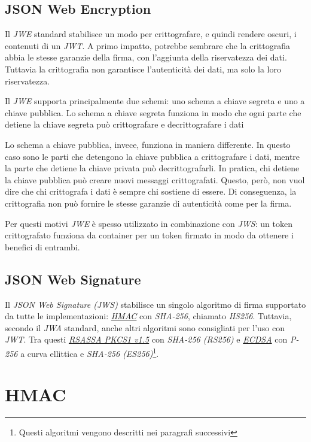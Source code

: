 \subsection{JSON Web Encryption}
Il \emph{\gls{JWE}} standard stabilisce un modo per crittografare, e quindi rendere oscuri, i contenuti di un \emph{JWT}.
A primo impatto, potrebbe sembrare che la crittografia abbia le stesse garanzie della firma, con l'aggiunta della riservatezza dei dati.
Tuttavia la crittografia non garantisce l'autenticità dei dati, ma solo la loro riservatezza.

Il \emph{JWE} supporta principalmente due schemi: uno schema a chiave segreta e uno a chiave pubblica.
Lo schema a chiave segreta funziona in modo che ogni parte che detiene la chiave segreta può crittografare e decrittografare i dati

Lo schema a chiave pubblica, invece, funziona in maniera differente.
In questo caso sono le parti che detengono la chiave pubblica a crittografare i dati, mentre la parte che detiene la chiave privata può decrittografarli.
In pratica, chi detiene la chiave pubblica può creare nuovi messaggi crittografati.
Questo, però, non vuol dire che chi crittografa i dati è sempre chi sostiene di essere. Di conseguenza, la crittografia non può fornire le stesse garanzie di autenticità come per la firma.

Per questi motivi \emph{JWE} è spesso utilizzato in combinazione con \emph{\gls{JWS}}: un token crittografato funziona da container per un token firmato in modo da ottenere i benefici di entrambi.

\subsection{JSON Web Signature}
Il \emph{JSON Web Signature (JWS)} stabilisce un singolo algoritmo di firma supportato da tutte le implementazioni: \emph{\hyperref[sec:hmac]{HMAC}} con \emph{\gls{SHA-256}}, chiamato \emph{HS256}.
Tuttavia, secondo il \emph{\gls{JWA}} standard, anche altri algoritmi sono consigliati per l'uso con \emph{JWT}.
Tra questi \emph{\hyperref[sec:rsassa]{RSASSA PKCS1 v1.5}} con \emph{SHA-256 (RS256)} e \emph{\hyperref[sec:ecdsa]{ECDSA}} con \emph{\gls{P-256}} a curva ellittica e \emph{SHA-256 (ES256)}\footnote{Questi algoritmi vengono descritti nei paragrafi successivi}.


\section{HMAC}
\label{sec:hmac}

